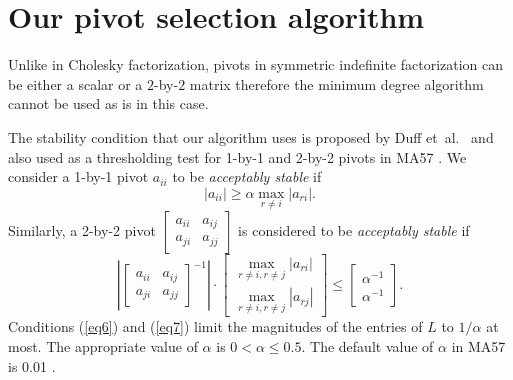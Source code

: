 \documentclass{article}
\begin{document}
\section{Our pivot selection algorithm} \label{sec4}

Unlike in Cholesky factorization, pivots in symmetric indefinite factorization can be either a scalar or a $2$-by-$2$ matrix therefore the minimum degree algorithm cannot be used as is in this case. 




The stability condition that our algorithm uses is proposed by Duff et~al.\ \cite{stCond} and also used as a thresholding test for 1-by-1 and 2-by-2 pivots in MA57 \cite{MA57}.
We consider a 1-by-1 pivot $a_{ii}$ to be \emph{acceptably stable} if
\begin{equation} \label{eq6}
|a_{ii}|\geq \alpha\max_{r\neq i}  |a_{ri}|.
\end{equation}
Similarly, a 2-by-2 pivot $\begin{bmatrix} a_{ii}&a_{ij}\\a_{ji}&a_{jj}\end{bmatrix}$ is considered to be \emph{acceptably stable} if 
\begin{equation}\label{eq7}
\left|\begin{bmatrix} a_{ii}&a_{ij}\\a_{ji}&a_{jj}\end{bmatrix}^{-1}\right|
\cdot \begin{bmatrix}\max_{r\neq i, r\neq j} |a_{ri}|\\ \max_{r\neq i, r\neq j}|a_{rj}|\end{bmatrix}
\leq
\begin{bmatrix}\alpha^{-1}\\\alpha^{-1}\end{bmatrix}.
\end{equation}
Conditions (\ref{eq6}) and (\ref{eq7}) limit the magnitudes of the entries of $L$ to $1/\alpha$ at most.
The appropriate value of $\alpha$ is $0<\alpha\leq 0.5$.
The default value of $\alpha$ in MA57 is 0.01 \cite{MA57}.
\end{document}
